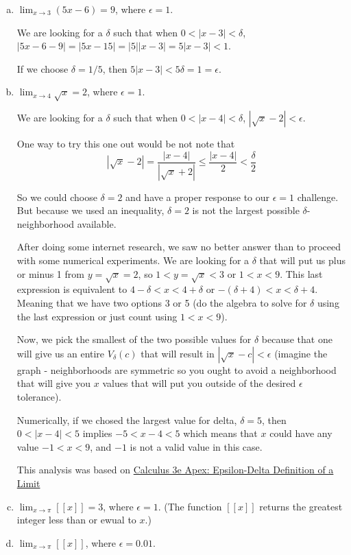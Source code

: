 \begin{enumerate}[(a)]
\item $\lim_{x\rightarrow 3} \left( 5x - 6 \right) = 9$, where $\epsilon = 1$.

We are looking for a $\delta$ such that when $0 < |x-3| < \delta$, $|5x -6 -9| = |5x- 15|= |5||x-3| = 5|x-3| < 1$.

If we choose $\delta = 1/5$, then $5|x-3| < 5\delta = 1 = \epsilon$.

\item $\lim_{x\rightarrow 4} \sqrt{x} = 2$, where $\epsilon = 1$.

We are looking for a $\delta$ such that when $0 < |x-4| < \delta$, $|\sqrt{x}-2| < \epsilon$.

One way to try this one out would be not note that
$$
|\sqrt{x}-2| = \frac{|x-4|}{|\sqrt{x}+2|} \leq \frac{|x-4|}{2} < \frac{\delta}{2}
$$

So we could choose $\delta = 2$ and have a proper response to our $\epsilon = 1$ challenge.
But because we used an inequality, $\delta = 2$ is not the largest possible $\delta$-neighborhood available.

After doing some internet research, we saw no better answer than to proceed with some numerical experiments.
We are looking for a $\delta$ that will put us plus or minus 1 from $y = \sqrt{x} = 2$, so $1 < y = \sqrt{x} < 3$
or $1 < x < 9$.
This last expression is equivalent to $4-\delta < x < 4+\delta$ or $-(\delta +4) < x < \delta + 4$.
Meaning that we have two options 3 or 5 (do the algebra to solve for $\delta$ using the last expression or just count using $1 < x < 9$).

Now, we pick the smallest of the two possible values for $\delta$ because that one will give us an entire $V_\delta (c)$ that will result
in $|\sqrt{x} - c| < \epsilon$ (imagine the graph - neighborhoods are symmetric so you ought to avoid a neighborhood that will give you $x$
values that will put you outside of the desired $\epsilon$ tolerance).

Numerically, if we chosed the largest value for delta, $\delta = 5$, then $0 < |x-4| < 5$ implies $-5 < x-4 < 5$ which means that $x$ could have any value
$-1 < x < 9$, and $-1$ is not a valid value in this case.

This analysis was based on
\href{https://math.libretexts.org/Bookshelves/Calculus/Calculus_3e_(Apex)/01%3A_Limits/1.02%3A_Epsilon-Delta_Definition_of_a_Limit}{Calculus 3e Apex: Epsilon-Delta Definition of a Limit}


\item $\lim_{x\rightarrow \pi} [[x]] = 3$, where $\epsilon = 1$.
(The function $[[x]]$ returns the greatest integer less than or ewual to $x$.)

\item $\lim_{x\rightarrow \pi} [[x]]$, where $\epsilon = 0.01$.
\end{enumerate}